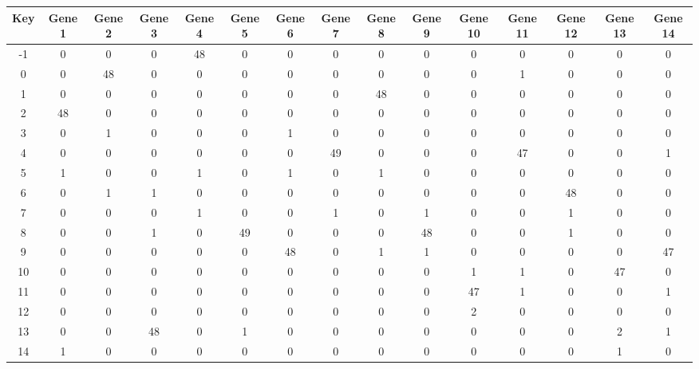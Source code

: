 \begin{tabular}{|c|c|c|c|c|c|c|c|c|c|c|c|c|c|c|}
\hline
Key & Gene 1 & Gene 2 & Gene 3 & Gene 4 & Gene 5 & Gene 6 & Gene 7 & Gene 8 & Gene 9 & Gene 10 & Gene 11 & Gene 12 & Gene 13 & Gene 14 \\
\hline
-1 & 0 & 0 & 0 & 48 & 0 & 0 & 0 & 0 & 0 & 0 & 0 & 0 & 0 & 0 \\
0 & 0 & 48 & 0 & 0 & 0 & 0 & 0 & 0 & 0 & 0 & 1 & 0 & 0 & 0 \\
1 & 0 & 0 & 0 & 0 & 0 & 0 & 0 & 48 & 0 & 0 & 0 & 0 & 0 & 0 \\
2 & 48 & 0 & 0 & 0 & 0 & 0 & 0 & 0 & 0 & 0 & 0 & 0 & 0 & 0 \\
3 & 0 & 1 & 0 & 0 & 0 & 1 & 0 & 0 & 0 & 0 & 0 & 0 & 0 & 0 \\
4 & 0 & 0 & 0 & 0 & 0 & 0 & 49 & 0 & 0 & 0 & 47 & 0 & 0 & 1 \\
5 & 1 & 0 & 0 & 1 & 0 & 1 & 0 & 1 & 0 & 0 & 0 & 0 & 0 & 0 \\
6 & 0 & 1 & 1 & 0 & 0 & 0 & 0 & 0 & 0 & 0 & 0 & 48 & 0 & 0 \\
7 & 0 & 0 & 0 & 1 & 0 & 0 & 1 & 0 & 1 & 0 & 0 & 1 & 0 & 0 \\
8 & 0 & 0 & 1 & 0 & 49 & 0 & 0 & 0 & 48 & 0 & 0 & 1 & 0 & 0 \\
9 & 0 & 0 & 0 & 0 & 0 & 48 & 0 & 1 & 1 & 0 & 0 & 0 & 0 & 47 \\
10 & 0 & 0 & 0 & 0 & 0 & 0 & 0 & 0 & 0 & 1 & 1 & 0 & 47 & 0 \\
11 & 0 & 0 & 0 & 0 & 0 & 0 & 0 & 0 & 0 & 47 & 1 & 0 & 0 & 1 \\
12 & 0 & 0 & 0 & 0 & 0 & 0 & 0 & 0 & 0 & 2 & 0 & 0 & 0 & 0 \\
13 & 0 & 0 & 48 & 0 & 1 & 0 & 0 & 0 & 0 & 0 & 0 & 0 & 2 & 1 \\
14 & 1 & 0 & 0 & 0 & 0 & 0 & 0 & 0 & 0 & 0 & 0 & 0 & 1 & 0 \\
\hline
\end{tabular}